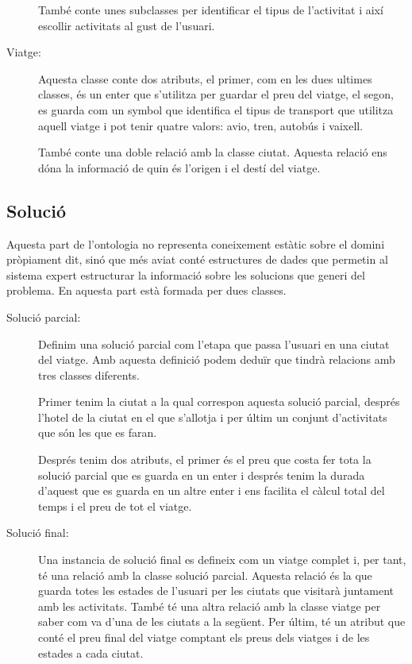 \documentclass[11pt,a4paper]{article}
\begin{document}
\begin{description}
També conte unes subclasses per identificar el tipus de l'activitat i així escollir activitats al gust de l'usuari.


\item[Viatge:] Aquesta classe conte dos atributs, el primer, com en les dues ultimes classes, és un enter que s'utilitza per guardar el preu del viatge, el segon, es guarda com un symbol que identifica el tipus de transport que utilitza aquell viatge i pot tenir quatre valors: avio, tren, autobús i vaixell.

També conte una doble relació amb la classe ciutat. Aquesta relació ens dóna la informació de quin és l'origen i el destí del viatge.
\end{description}

\subsection{Solució} 
Aquesta part de l'ontologia no representa coneixement estàtic sobre el domini pròpiament dit, sinó que més aviat conté estructures de dades que permetin al sistema expert estructurar la informació sobre les solucions que generi del problema. En aquesta part està formada per dues classes.

\begin{description}
\item[Solució parcial:] Definim una solució parcial com l'etapa que passa l'usuari en una ciutat del viatge. Amb aquesta definició podem deduïr que tindrà relacions amb tres classes diferents.

Primer tenim la ciutat a la qual correspon aquesta solució parcial, després l'hotel de la ciutat en el que s'allotja i per últim un conjunt d'activitats que són les que es faran.

Després tenim dos atributs, el primer és el preu que costa fer tota la solució parcial que es guarda en un enter i després tenim la durada d'aquest que es guarda en un altre enter i ens facilita el càlcul total del temps i el preu de tot el viatge.

\item[Solució final:] Una instancia de solució final es defineix com un viatge complet i, per tant, té una relació amb la classe solució parcial. Aquesta relació és la que guarda totes les estades de l'usuari per les ciutats que visitarà juntament amb les activitats. També té una altra relació amb la classe viatge per saber com va d'una de les ciutats a la següent. Per últim, té un atribut que conté el preu final del viatge comptant els preus dels viatges i de les estades a cada ciutat.

\end{description}
\end{document}
